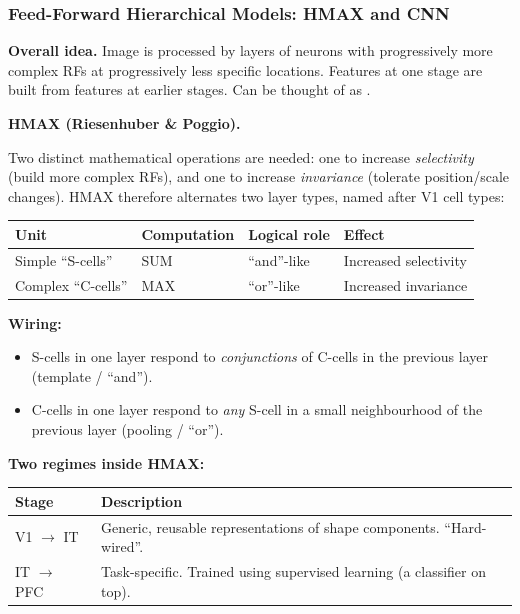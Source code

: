 \bigseparator

\subsubsection{Feed-Forward Hierarchical Models: HMAX and CNN}

\textbf{Overall idea.} Image is processed by layers of neurons with progressively more complex RFs at progressively less specific locations. Features at one stage are built from features at earlier stages. Can be thought of as .

\separator

\textbf{HMAX (Riesenhuber \& Poggio).}

\begin{defbox}
Two distinct mathematical operations are needed: one to increase \emph{selectivity} (build more complex RFs), and one to increase \emph{invariance} (tolerate position/scale changes). HMAX therefore alternates two layer types, named after V1 cell types:
\end{defbox}

\begin{center}
\renewcommand{\arraystretch}{1.3}
\begin{tabular}{@{} l l l l @{}}
\toprule
\textbf{Unit} & \textbf{Computation} & \textbf{Logical role} & \textbf{Effect} \\
\midrule
Simple ``S-cells''  & SUM   & ``and''-like & Increased selectivity \\
Complex ``C-cells'' & MAX   & ``or''-like  & Increased invariance \\
\bottomrule
\end{tabular}
\end{center}

\textbf{Wiring:}
\begin{itemize}
  \item S-cells in one layer respond to \emph{conjunctions} of C-cells in the previous layer (template / ``and'').
  \item C-cells in one layer respond to \emph{any} S-cell in a small neighbourhood of the previous layer (pooling / ``or'').
\end{itemize}

\textbf{Two regimes inside HMAX:}
\begin{center}
\renewcommand{\arraystretch}{1.3}
\begin{tabular}{@{} l p{8cm} @{}}
\toprule
\textbf{Stage} & \textbf{Description} \\
\midrule
V1 $\rightarrow$ IT  & Generic, reusable representations of shape components. ``Hard-wired''. \\
IT $\rightarrow$ PFC & Task-specific. Trained using supervised learning (a classifier on top). \\
\bottomrule
\end{tabular}
\end{center}

